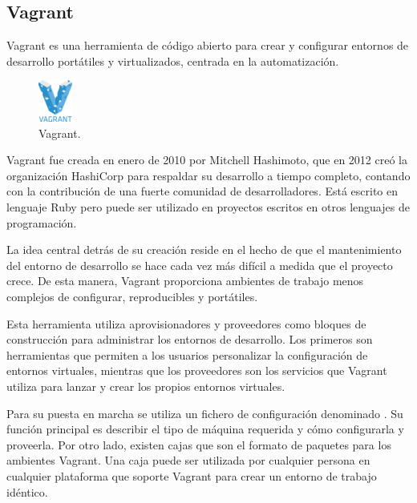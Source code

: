 \subsection{Vagrant}

Vagrant\cite{vagrant} es una herramienta de código abierto para crear y configurar entornos de desarrollo portátiles y virtualizados, centrada en la automatización.

\begin{figure}[H]
\centering
\includegraphics[width=0.1\textwidth]{images/figures/vagrant.png}
\caption{Vagrant.\footnotemark}
\end{figure}


Vagrant fue creada en enero de 2010 por Mitchell Hashimoto, que en 2012 creó la organización HashiCorp para respaldar su desarrollo a tiempo completo, contando con la contribución de una fuerte comunidad de desarrolladores. Está escrito en lenguaje Ruby pero puede ser utilizado en proyectos escritos en otros lenguajes de programación.

La idea central detrás de su creación reside en el hecho de que el mantenimiento del entorno de desarrollo se hace cada vez más difícil a medida que el proyecto crece. De esta manera, Vagrant proporciona ambientes de trabajo menos complejos de configurar, reproducibles y portátiles.

Esta herramienta utiliza aprovisionadores y proveedores como bloques de construcción para administrar los entornos de desarrollo. Los primeros son herramientas que permiten a los usuarios personalizar la configuración de entornos virtuales, mientras que los proveedores son los servicios que Vagrant utiliza para lanzar y crear los propios entornos virtuales.

Para su puesta en marcha se utiliza un fichero de configuración denominado . Su función principal es describir el tipo de máquina requerida y cómo configurarla y proveerla. Por otro lado, existen cajas que son el formato de paquetes para los ambientes Vagrant. Una caja puede ser utilizada por cualquier persona en cualquier plataforma que soporte Vagrant para crear un entorno de trabajo idéntico.

